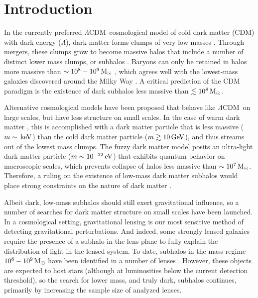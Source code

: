 \documentclass[twocolumn]{aastex62}
\newcommand{\acronym}[1]{{\small{#1}}}
\newcommand{\lcdm}{\acronym{$\Lambda$CDM}}
\begin{document}

\section{Introduction}
\label{sec:intro}
In the currently preferred \lcdm\ cosmological model of cold dark matter (CDM) with dark energy ($\Lambda$), dark matter forms clumps of very low masses \citep[e.g.,][]{springel2008}.
Through mergers, these clumps grow to become massive halos that include a number of distinct lower mass clumps, or subhalos \citep[e.g.,][]{whiterees1978}.
Baryons can only be retained in halos more massive than $\sim10^8-10^9\,\rm M_\odot$ \citep[e.g.,][]{efstathiou1992, bullock2000}, which agrees well with the lowest-mass galaxies discovered around the Milky Way \citep[e.g.,][]{sg2007, martin2008}.
A critical prediction of the CDM paradigm is the existence of dark subhalos less massive than $\lesssim10^8\,\rm M_\odot$.

Alternative cosmological models have been proposed that behave like \lcdm\ on large scales, but have less structure on small scales.
In the case of warm dark matter \citep[e.g.,][]{bode2001}, this is accomplished with a dark matter particle that is less massive ($m\sim\rm\, keV$) than the cold dark matter particle ($m\gtrsim10\rm\, GeV$), and thus streams out of the lowest mass clumps.
The fuzzy dark matter model \citep[e.g.,][]{hu2000} posits an ultra-light dark matter particle ($m\sim10^{-22}\rm\, eV$) that exhibits quantum behavior on macroscopic scales, which prevents collapse of halos less massive than $\sim10^7\,\rm M_\odot$.
Therefore, a ruling on the existence of low-mass dark matter subhalos would place strong constraints on the nature of dark matter \citep[e.g.,][]{bullockmbk2017, buckleypeter2017}.

Albeit dark, low-mass subhalos should still exert gravitational influence, so a number of searches for dark matter structure on small scales have been launched.
In a cosmological setting, gravitational lensing is our most sensitive method of detecting gravitational perturbations.
And indeed, some strongly lensed galaxies require the presence of a subhalo in the lens plane to fully explain the distribution of light in the lensed system.
To date, subhalos in the mass regime $10^8-10^9\,\rm M_\odot$ have been identified in a number of lenses \citep[e.g.,][]{vegetti2012,hezaveh2016}.
However, these objects are expected to host stars (although at luminosities below the current detection threshold), so the search for lower mass, and truly dark, subhalos continues, primarily by increasing the sample size of analyzed lenses.
\end{document}
